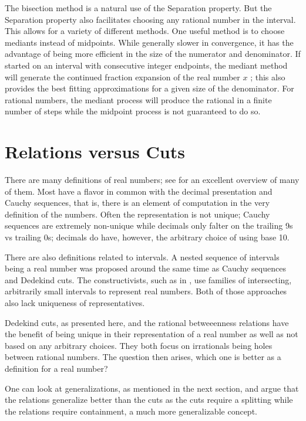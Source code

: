\documentclass[12pt]{article}
\begin{document}
The bisection method is a natural use of the Separation property. But the Separation property also facilitates choosing any rational number in the interval. This allows for a variety of different methods. One useful method is to choose mediants instead of midpoints. While generally slower in convergence, it has the advantage of being more efficient in the size of the numerator and denominator. If started on an interval with consecutive integer endpoints, the mediant method will generate the continued fraction expansion of the real number $x$ \cite{richards}; this also provides the best fitting approximations for a given size of the denominator. For rational numbers, the mediant process will produce the rational in a finite number of steps while the midpoint process is not guaranteed to do so. 


\section{Relations versus Cuts}

There are many definitions of real numbers; see \cite{ittay-2015} for an excellent overview of many of them. Most have a flavor in common with the decimal presentation and Cauchy sequences, that is, there is an element of computation in the very definition of the numbers. Often the representation is not unique; Cauchy sequences are extremely non-unique while decimals only falter on the trailing 9s vs trailing 0s; decimals do have, however, the arbitrary choice of using base 10. 

There are also definitions related to intervals. A nested sequence of intervals being a real number was proposed around the same time as Cauchy sequences and Dedekind cuts. The constructivists, such as in \cite{bridger}, use families of intersecting, arbitrarily small intervals to represent real numbers. Both of those approaches also lack uniqueness of representatives. 

Dedekind cuts, as presented here, and the rational betweeenness relations have the benefit of being unique in their representation of a real number as well as not based on any arbitrary choices. They both focus on irrationals being holes between rational numbers. The question then arises, which one is better as a definition for a real number? 

One can look at generalizations, as mentioned in the next section, and argue that the relations generalize better than the cuts as the cuts require a splitting while the relations require containment, a much more generalizable concept. 
\end{document}
